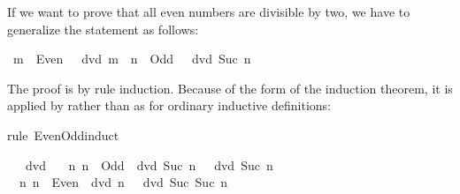 \begin{isabellebody}
\begin{isamarkuptext}
If we want to prove that all even numbers are divisible by two, we have to
generalize the statement as follows:%
\end{isamarkuptext}%
\isamarkuptrue%
\isamarkupfalse%
\ {}{}m\ {}\ Even\ {}\ {}\ dvd\ m{}\ {}\ {}n\ {}\ Odd\ {}\ {}\ dvd\ {}Suc\ n{}{}{}%
\isadelimproof
%
\endisadelimproof
%
\isatagproof
%
\begin{isamarkuptxt}%
\noindent
The proof is by rule induction. Because of the form of the induction theorem,
it is applied by  rather than  as for ordinary
inductive definitions:%
\end{isamarkuptxt}%
\isamarkuptrue%
\isamarkupfalse%
{}rule\ Even{}Odd{}induct{}%
\begin{isamarkuptxt}%
\begin{isabelle}%
\ {}{}\ {}\ dvd\ {}\isanewline
\ {}{}\ {}n{}\ {}n\ {}\ Odd{}\ {}\ dvd\ Suc\ n{}\ {}\ {}\ dvd\ Suc\ n\isanewline
\ {}{}\ {}n{}\ {}n\ {}\ Even{}\ {}\ dvd\ n{}\ {}\ {}\ dvd\ Suc\ {}Suc\ n{}%
\end{isabelle}

\end{isamarkuptxt}
\end{isabellebody}
